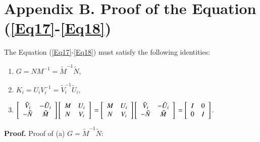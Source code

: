 \documentclass[journal]{IEEEtran}
\begin{document}
\section*{Appendix B. Proof of the Equation (\ref{Eq17}-\ref{Eq18})}
\label{AppendixB}

The Equation (\ref{Eq17}-\ref{Eq18}) must satisfy the following identities:

\begin{enumerate}
  \item $G=N M^{-1}=\tilde{M}^{-1} \tilde{N}$,
  \item $K_{i}=U_{i} V_{i}^{-1}=\tilde{V}_{i}^{-1} \tilde{U}_{i}$,
  \item    $ \left[\begin{array}{cc}
              \tilde{V}_{i} & -\tilde{U}_{i} \\
              -\tilde{N}    & \tilde{M}
            \end{array}\right]\left[\begin{array}{cc}
              M & U_{i} \\
              N & V_{i}
            \end{array}\right]\\
          =\left[\begin{array}{cc}
              M & U_{i} \\
              N & V_{i}
            \end{array}\right]\left[\begin{array}{cc}
              \tilde{V}_{i} & -\tilde{U}_{i} \\
              -\tilde{N}    & \tilde{M}
            \end{array}\right]\\
          =\left[\begin{array}{cc}
              I & 0 \\
              0 & I
            \end{array}\right].$
\end{enumerate}


\textbf{Proof.} Proof of (a) $G=\tilde{M}^{-1} \tilde{N}$:
\end{document}
